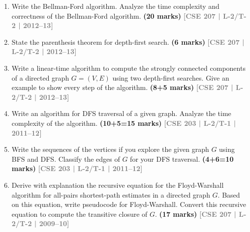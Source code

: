 \documentclass[12pt,a3paper]{article}
\newcommand{\yr}[1]{\hfill\textcolor{gray}{\small\textbf{[#1]}}}
\newcommand{\mk}[1]{\textcolor{orange!70!black}{\small\textbf{(#1 marks)}}}
\begin{document}
\begin{enumerate}
\begin{center}
\begin{tikzpicture}[
    every node/.style={circle, draw, minimum size=0.9cm, font=\bfseries},
    every path/.style={->, line width=0.8pt},
  ]
  \end{tikzpicture}
\end{center}


\item Write the Bellman-Ford algorithm. Analyze the time complexity and correctness of the Bellman-Ford algorithm. \mk{20}
\yr{CSE 207 | L-2/T-2 | 2012--13}

\item State the parenthesis theorem for depth-first search. \mk{6}
\yr{CSE 207 | L-2/T-2 | 2012--13}

\item Write a linear-time algorithm to compute the strongly connected components of a directed graph $G = (V, E)$ using two depth-first searches. Give an example to show every step of the algorithm. \mk{8+5}
\yr{CSE 207 | L-2/T-2 | 2012--13}

\item Write an algorithm for DFS traversal of a given graph. Analyze the time
complexity of the algorithm. \mk{10+5=15}
\yr{CSE 203 | L-2/T-1 | 2011--12}

\item Write the sequences of the vertices if you explore the given graph $G$ using BFS and DFS. Classify the edges of $G$ for your DFS traversal. \mk{4+6=10}
\yr{CSE 203 | L-2/T-1 | 2011--12}

\begin{center}
\end{center}

\item Derive with explanation the recursive equation for the Floyd-Warshall algorithm for all-pairs shortest-path estimates in a directed graph $G$. Based on this equation, write pseudocode for Floyd-Warshall. Convert this recursive equation to compute the transitive closure of $G$. \mk{17}
\yr{CSE 207 | L-2/T-2 | 2009--10}


\end{enumerate}
\end{document}
